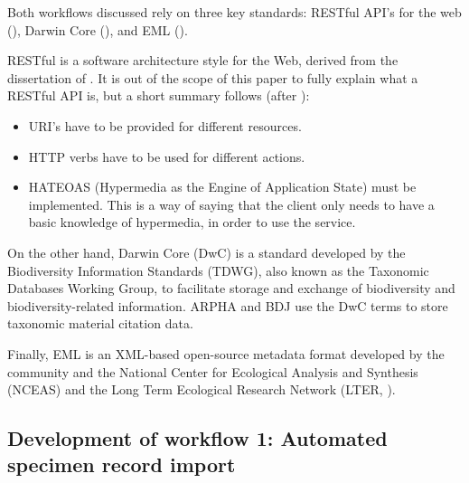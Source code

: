 Both workflows discussed  rely on three key standards: RESTful API's for the web (\cite{kurtz_what_2013}), Darwin Core (\cite{wieczorek_darwin_2012}), and EML (\cite{fegraus_maximizing_2005}).

RESTful is a software architecture style for the Web, derived from the dissertation of \cite{fielding_architectural_2000}. It is out of the scope of this paper to fully explain what a RESTful API is, but a short summary follows (after \cite{kurtz_what_2013}):

\begin{itemize}
\item{URI's have to be provided for different resources.}
\item{HTTP verbs have to be used for different actions.}
\item{HATEOAS (Hypermedia as the Engine of Application State) must be implemented. This is a way of saying that the client only needs to have a basic knowledge of hypermedia, in order to use the service.}
\end{itemize}

On the other hand, Darwin Core (DwC) is a standard developed by the Biodiversity Information Standards (TDWG), also known as the Taxonomic Databases Working Group, to facilitate storage and exchange of biodiversity and biodiversity-related information. ARPHA and BDJ use the DwC terms to store taxonomic material citation data.

Finally, EML is an XML-based open-source metadata format developed by the community and the National Center for Ecological Analysis and Synthesis (NCEAS) and the Long Term Ecological Research Network (LTER, \cite{fegraus_maximizing_2005}).

\subsection{Development of workflow 1: Automated specimen record import}

